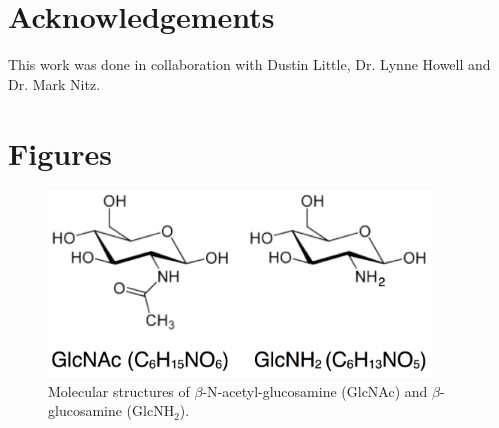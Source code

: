 \section{Acknowledgements}
This work was done in collaboration with Dustin Little, Dr. Lynne Howell and Dr. Mark Nitz.

\section{Figures}

\begin{figure}[htbp]
\centering
\includegraphics[width=4in]{figures/results4/sugar_structures.pdf}
\caption[Molecular structures of GlcNAc and GlcNH$_2$]{Molecular structures of $\beta$-N-acetyl-glucosamine (GlcNAc) and $\beta$-glucosamine (GlcNH$_2$).}
\label{fig:nag}
\end{figure}



